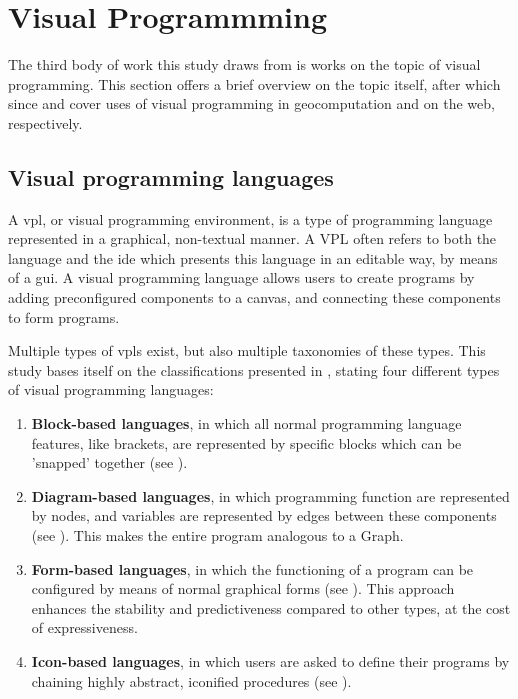 \newpage

\section{Visual Programmming}
\label{sec:background-vpl}

The third body of work this study draws from is works on the topic of visual programming. 
This section offers a brief overview on the topic itself, after which since  and  cover uses of visual programming in geocomputation and on the web, respectively. 

\subsection*{Visual programming languages}

A \ac{vpl}, or visual programming environment, is a type of programming language represented in a graphical, non-textual manner.
A VPL often refers to both the language and the \ac{ide} which presents this language in an editable way, by means of a \ac{gui}.
A visual programming language allows users to create programs by adding preconfigured components to a canvas, and connecting these components to form programs. 

Multiple types of \ac{vpl}s exist, but also multiple taxonomies of these types.
This study bases itself on the classifications presented in \cite{kuhail_characterizing_2021}, stating four different types of visual programming languages: 
\begin{enumerate}
  \item \textbf{Block-based languages}, in which all normal programming language features, like brackets, are represented by specific blocks which can be 'snapped' together (see ).
  \item \textbf{Diagram-based languages}, in which programming function are represented by nodes, and variables are represented by edges between these components (see ). This makes the entire program analogous to a Graph.
  \item \textbf{Form-based languages}, in which the functioning of a program can be configured by means of normal graphical forms (see ). 
  This approach enhances the stability and predictiveness compared to other types, at the cost of expressiveness.
  \item \textbf{Icon-based languages}, in which users are asked to define their programs by chaining highly abstract, iconified procedures (see ). 
\end{enumerate}


